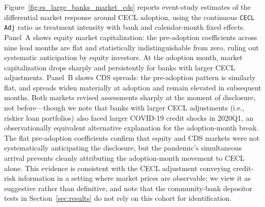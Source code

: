 Figure~\ref{fig:es_large_banks_market_cds} reports event-study estimates of
the differential market response around CECL adoption, using the continuous
\texttt{CECL Adj} ratio as treatment intensity with bank and
calendar-month fixed effects.  Panel~A shows equity market capitalization:
the pre-adoption coefficients across nine lead months are flat and
statistically indistinguishable from zero, ruling out systematic anticipation
by equity investors.  At the adoption month, market capitalization drops
sharply and persistently for banks with larger CECL adjustments.  Panel~B
shows CDS spreads: the pre-adoption pattern is similarly flat, and spreads
widen materially at adoption and remain elevated in subsequent months.
Both markets revised assessments sharply at the moment of disclosure, not
before---though we note that banks with larger CECL adjustments (i.e.,
riskier loan portfolios) also faced larger COVID-19 credit shocks in 2020Q1,
an observationally equivalent alternative explanation for the adoption-month
break.  The flat pre-adoption coefficients confirm that equity and CDS markets
were not systematically anticipating the disclosure, but the pandemic's
simultaneous arrival prevents cleanly attributing the adoption-month movement
to CECL alone.  This evidence is consistent with the CECL adjustment conveying
credit-risk information in a setting where market prices are observable; we
view it as suggestive rather than definitive, and note that the
community-bank depositor tests in Section~\ref{sec:results} do not rely on
this cohort for identification.
